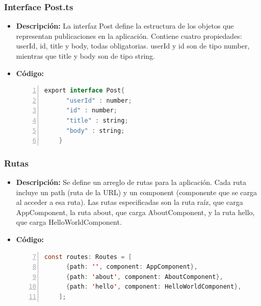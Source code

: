 \documentclass{article}
\begin{document}
  \subsubsection{Interface Post.ts}
  \begin{itemize}
    \item \textbf{Descripción: }La interfaz Post define la estructura de los objetos que representan publicaciones 
    en la aplicación. Contiene cuatro propiedades: userId, id, title y body, todas obligatorias. userId y id son 
    de tipo number, mientras que title y body son de tipo string.
    \item \textbf{Código: }
    \begin{lstlisting}[language=java, numbers=left, firstnumber=1, numberstyle=\color{black}]
    export interface Post{
      "userId" : number;
      "id" : number;
      "title" : string;
      "body" : string;
    }
    \end{lstlisting}
  \end{itemize}

  \subsubsection{Rutas}
  \begin{itemize}
    \item \textbf{Descripción: }Se define un arreglo de rutas para la aplicación. Cada ruta incluye un path 
    (ruta de la URL) y un component (componente que se carga al acceder a esa ruta). Las rutas especificadas 
    son la ruta raíz, que carga AppComponent, la ruta about, que carga AboutComponent, y la ruta hello, que 
    carga HelloWorldComponent.
    \item \textbf{Código: }
    \begin{lstlisting}[language=java, numbers=left, firstnumber=7, numberstyle=\color{black}]
    const routes: Routes = [
      {path: '', component: AppComponent},
      {path: 'about', component: AboutComponent},
      {path: 'hello', component: HelloWorldComponent},
    ];
    \end{lstlisting}
  \end{itemize}
  
\end{document}
